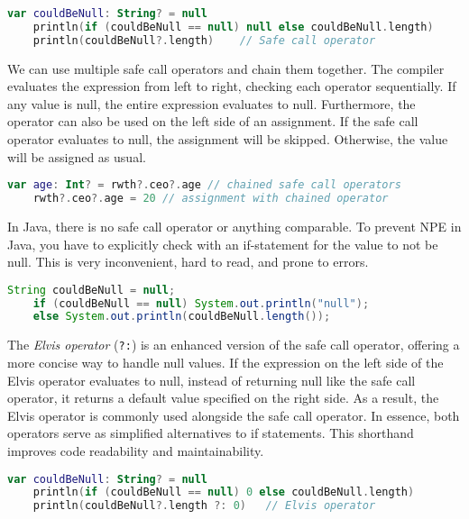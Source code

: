 \documentclass[a4paper, 11pt]{article}
\begin{document}
  \begin{lstlisting}[language=Kotlin,title={Using the safe call operator in comparison to an if statement}]
    var couldBeNull: String? = null
    println(if (couldBeNull == null) null else couldBeNull.length)
    println(couldBeNull?.length)    // Safe call operator
  \end{lstlisting}
  We can use multiple safe call operators and chain them together. The compiler evaluates the expression from left to right, checking each operator sequentially. If any value is null, the entire expression evaluates to null.
  Furthermore, the operator can also be used on the left side of an assignment. If the safe call operator evaluates to null, the assignment will be skipped. Otherwise, the value will be assigned as usual.
  \begin{lstlisting}[language=Kotlin]
    var age: Int? = rwth?.ceo?.age // chained safe call operators
    rwth?.ceo?.age = 20 // assignment with chained operator
  \end{lstlisting}

  In Java, there is no safe call operator or anything comparable. To prevent NPE in Java, you have to explicitly check with an if-statement for the value to not be null. This is very inconvenient, hard to read, and prone to errors.
  \begin{lstlisting}[language=Java,title={Prevent NPE in Java}]
    String couldBeNull = null;
    if (couldBeNull == null) System.out.println("null");
    else System.out.println(couldBeNull.length());
  \end{lstlisting}
  \hfill \break

  The \textit{Elvis operator} (\texttt{?:}) is an enhanced version of the safe call operator, offering a more concise way to handle null values. If the expression on the left side of the Elvis operator evaluates to null, instead of returning null like the safe call operator, it returns a default value specified on the right side. As a result, the Elvis operator is commonly used alongside the safe call operator. In essence, both operators serve as simplified alternatives to if statements. This shorthand improves code readability and maintainability. %
  \begin{lstlisting}[language=Kotlin,title={Using the Elvis operator in comparison to an if statement}]
    var couldBeNull: String? = null
    println(if (couldBeNull == null) 0 else couldBeNull.length)
    println(couldBeNull?.length ?: 0)   // Elvis operator
  \end{lstlisting}
\end{document}

